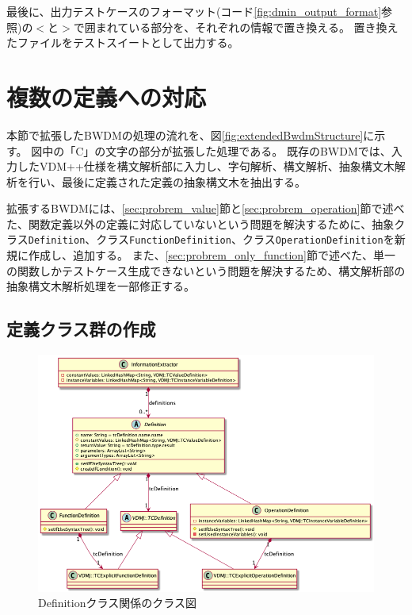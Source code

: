 \documentclass[uplatex, report, a4j, 10pt]{jsbook}
\newcommand\ttt[1]{\texttt{#1}}
\begin{document}
最後に、出力テストケースのフォーマット(コード\ref{fig:dmin_output_format}参照)の$<$と$>$で囲まれている部分を、それぞれの情報で置き換える。
置き換えたファイルをテストスイートとして出力する。

\section{複数の定義への対応}\label{sec:extendMultiple}
本節で拡張したBWDMの処理の流れを、図\ref{fig:extendedBwdmStructure}に示す。
図中の「C」の文字の部分が拡張した処理である。
既存のBWDMでは、入力したVDM++仕様を構文解析部に入力し、字句解析、構文解析、抽象構文木解析を行い、最後に定義された定義の抽象構文木を抽出する。

拡張するBWDMには、\ref{sec:probrem_value}節と\ref{sec:probrem_operation}節で述べた、関数定義以外の定義に対応していないという問題を解決するために、抽象クラス\ttt{Definition}、クラス\ttt{FunctionDefinition}、クラス\ttt{OperationDefinition}を新規に作成し、追加する。
また、\ref{sec:probrem_only_function}節で述べた、単一の関数しかテストケース生成できないという問題を解決するため、構文解析部の抽象構文木解析処理を一部修正する。

\subsection{定義クラス群の作成}\label{sec:create_definition}
\begin{figure}[tp]
  \centering
  \includegraphics[keepaspectratio, width=160mm]{figs/Definition_class_diagram}
  \caption{Definitionクラス関係のクラス図}
  \label{fig:definition_class}
\end{figure}
\end{document}
